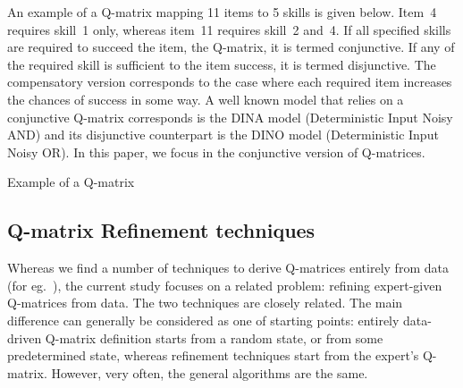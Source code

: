 \documentclass[runningheads,a4paper]{llncs}
\begin{document}
An example of a Q-matrix mapping 11 items to 5 skills is given below. Item~4 requires skill~1 only, whereas item~11 requires skill~2 and~4. If all specified skills are required to succeed the item, the Q-matrix, it is termed conjunctive. If any of the required skill is sufficient to the item success, it is termed disjunctive. The compensatory version corresponds to the case where each required item increases the chances of success in some way. A well known model that relies on a conjunctive Q-matrix corresponds is the DINA model (Deterministic Input Noisy AND) and its disjunctive counterpart is the DINO model (Deterministic Input Noisy OR). In this paper, we focus in the conjunctive version of Q-matrices.
\begin {table}[h]
\tiny
\begin{center}
%
\end{center}
\caption{Example of a Q-matrix}\label{Qm} 
\end{table}


\subsection{Q-matrix Refinement techniques}

Whereas we find a number of techniques to derive Q-matrices entirely from data (for eg.\ \cite{barnes2010novel,chiu2013statistical,de2008empirically,nivznan2014mapping}), the current study focuses on a related problem: refining expert-given Q-matrices from data. The two techniques are closely related.  The main difference can generally be considered as one of starting points: entirely data-driven Q-matrix definition starts from a random state, or from some predetermined state, whereas refinement techniques start from the expert's Q-matrix.  However, very often, the general algorithms are the same.  
\end{document}
